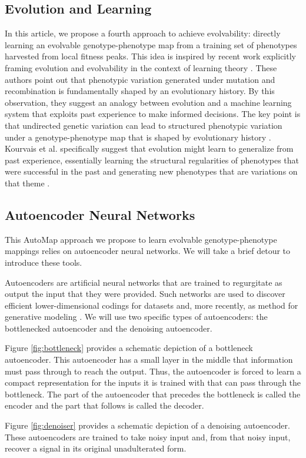\subsection{Evolution and Learning}

In this article, we propose a fourth approach to achieve evolvability: directly learning an evolvable genotype-phenotype map from a training set of phenotypes harvested from local fitness peaks.
This idea is inspired by recent work explicitly framing evolution and evolvability in the context of learning theory \cite{kouvaris2017evolution, watson2016can}.
These authors point out that phenotypic variation generated under mutation and recombination is fundamentally shaped by an evolutionary history.
By this observation, they suggest an analogy between evolution and a machine learning system that exploits past experience to make informed decisions.
The key point is that undirected genetic variation can lead to structured phenotypic variation under a genotype-phenotype map that is shaped by evolutionary history \cite{watson2016can}.
Kourvais et al. specifically suggest that evolution might learn to generalize from past experience, essentially learning the structural regularities of phenotypes that were successful in the past and generating new phenotypes that are variations on that theme \cite{kouvaris2017evolution}.

\subsection{Autoencoder Neural Networks}

This AutoMap approach we propose to learn evolvable genotype-phenotype mappings relies on autoencoder neural networks.
We will take a brief detour to introduce these tools.

Autoencoders are artificial neural networks that are trained to regurgitate as output the input that they were provided.
Such networks are used to discover efficient lower-dimensional codings for datasets and, more recently, as method for generative modeling \cite{liou2014autoencoder, kingma2013auto}.
We will use two specific types of autoencoders: the bottlenecked autoencoder and the denoising autoencoder.



Figure \ref{fig:bottleneck} provides a schematic depiction of a bottleneck autoencoder.
This autoencoder has a small layer in the middle that information must pass through to reach the output.
Thus, the autoencoder is forced to learn a compact representation for the inputs it is trained with that can pass through the bottleneck.
The part of the autoencoder that precedes the bottleneck is called the encoder and the part that follows is called the decoder.



Figure \ref{fig:denoiser} provides a schematic depiction of a denoising autoencoder.
These autoencoders are trained to take noisy input and, from that noisy input, recover a signal in its original unadulterated form.

